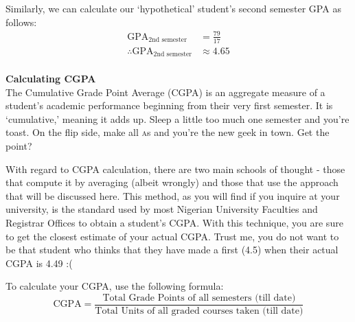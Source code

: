 \documentclass[letter]{article}
\begin{document}
\begin{table}[h]
	\centering
	\label{tab:second}
\end{table}

Similarly, we can calculate our `hypothetical' student's second semester GPA as follows:
\begin{align*}
	\text{GPA}_{\text{2nd semester}}            & = \frac{79}{17} \\
	\therefore \text{GPA}_{\text{2nd semester}} & \approx 4.65    \\
\end{align*}

\sffamily
\textbf{Calculating CGPA}\\
\normalfont
The Cumulative Grade Point Average (CGPA) is an aggregate measure of a student's academic performance beginning from their very first semester. It is `cumulative,' meaning it adds up. Sleep a little too much one semester and you're toast. On the flip side, make all \textsc{a}s and you're the new geek in town. Get the point?

With regard to CGPA calculation, there are two main schools of thought - those that compute it by averaging (albeit wrongly) and those that use the approach that will be discussed here. This method, as you will find if you inquire at your university, is the standard used by most Nigerian University Faculties and Registrar Offices to obtain a student's CGPA. With this technique, you are sure to get the closest estimate of your actual CGPA. Trust me, you do not want to be that student who thinks that they have made a first (4.5) when their actual CGPA is 4.49 :(

To calculate your CGPA, use the following formula:
\begin{equation}
	\text{CGPA} = \frac{\text{Total Grade Points of all semesters (till date)}}{\text{Total Units of all graded courses taken (till date)}}
\end{equation}
\end{document}
